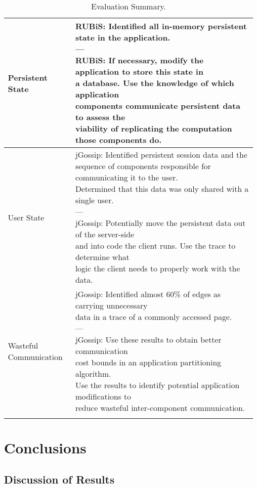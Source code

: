 \documentclass[msc,oneside]{ubcthesis}
\makeatletter
\newcommand{\specialcell}[2][c]{%
  \begin{tabular}[#1]{@{}l@{}}#2\end{tabular}}
\makeatother
\begin{document}
\begin{longtable}{|l|l|}
      Persistent State & \specialcell[t]{RUBiS: Identified all in-memory persistent state in the application. \\---\\RUBiS: If necessary, modify the application to store this state in\\ a database. Use the knowledge of which application\\ components communicate persistent data to assess the \\viability of replicating the computation those components do.} \\ \hline
      User State & \specialcell[t]{jGossip: Identified persistent session data and the \\sequence of components responsible for communicating it to the user.\\ Determined that this data was only shared with a single user. \\---\\jGossip: Potentially move the persistent data out of the server-side\\ and into code the client runs. Use the trace to determine what\\ logic the client needs to properly work with the data.} \\ \hline
      \specialcell[t]{Wasteful\\Communication} & \specialcell[t]{jGossip: Identified almost 60\% of edges as carrying unnecessary\\ data in a trace of a commonly accessed page. \\---\\jGossip: Use these results to obtain better communication \\cost bounds in an application partitioning algorithm.\\ Use the results to identify potential application modifications to\\reduce wasteful inter-component communication.} \\ \hline
    \caption{
      Evaluation Summary.}
\end{longtable}

\chapter{Conclusions} %

\section{Discussion of Results}
\end{document}
